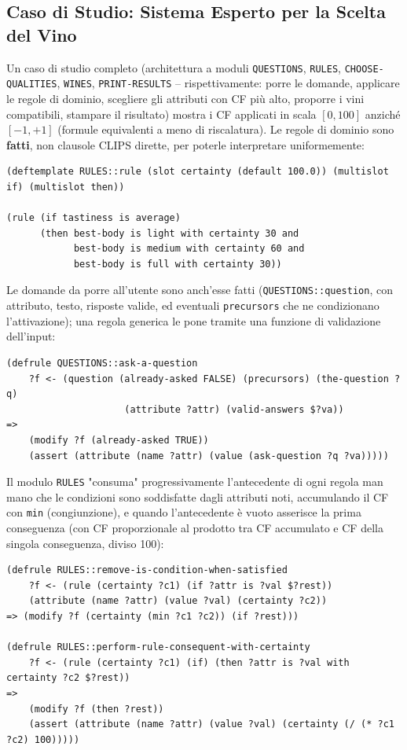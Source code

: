 \documentclass[a4paper,11pt]{article}
\begin{document}
\subsection{Caso di Studio: Sistema Esperto per la Scelta del Vino}

Un caso di studio completo (architettura a moduli \texttt{QUESTIONS}, \texttt{RULES}, \texttt{CHOOSE-QUALITIES}, \texttt{WINES}, \texttt{PRINT-RESULTS} -- rispettivamente: porre le domande, applicare le regole di dominio, scegliere gli attributi con CF più alto, proporre i vini compatibili, stampare il risultato) mostra i CF applicati in scala $[0,100]$ anziché $[-1,+1]$ (formule equivalenti a meno di riscalatura). Le regole di dominio sono \textbf{fatti}, non clausole CLIPS dirette, per poterle interpretare uniformemente:
\begin{lstlisting}
(deftemplate RULES::rule (slot certainty (default 100.0)) (multislot if) (multislot then))

(rule (if tastiness is average)
      (then best-body is light with certainty 30 and
            best-body is medium with certainty 60 and
            best-body is full with certainty 30))
\end{lstlisting}
Le domande da porre all'utente sono anch'esse fatti (\texttt{QUESTIONS::question}, con attributo, testo, risposte valide, ed eventuali \texttt{precursors} che ne condizionano l'attivazione); una regola generica le pone tramite una funzione di validazione dell'input:
\begin{lstlisting}
(defrule QUESTIONS::ask-a-question
    ?f <- (question (already-asked FALSE) (precursors) (the-question ?q)
                     (attribute ?attr) (valid-answers $?va))
=>
    (modify ?f (already-asked TRUE))
    (assert (attribute (name ?attr) (value (ask-question ?q ?va)))))
\end{lstlisting}
Il modulo \texttt{RULES} "consuma" progressivamente l'antecedente di ogni regola man mano che le condizioni sono soddisfatte dagli attributi noti, accumulando il CF con \texttt{min} (congiunzione), e quando l'antecedente è vuoto asserisce la prima conseguenza (con CF proporzionale al prodotto tra CF accumulato e CF della singola conseguenza, diviso 100):
\begin{lstlisting}
(defrule RULES::remove-is-condition-when-satisfied
    ?f <- (rule (certainty ?c1) (if ?attr is ?val $?rest))
    (attribute (name ?attr) (value ?val) (certainty ?c2))
=> (modify ?f (certainty (min ?c1 ?c2)) (if ?rest)))

(defrule RULES::perform-rule-consequent-with-certainty
    ?f <- (rule (certainty ?c1) (if) (then ?attr is ?val with certainty ?c2 $?rest))
=>
    (modify ?f (then ?rest))
    (assert (attribute (name ?attr) (value ?val) (certainty (/ (* ?c1 ?c2) 100)))))
\end{lstlisting}
\end{document}
